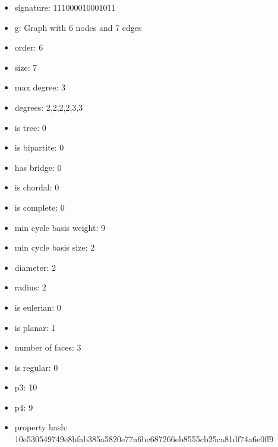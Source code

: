 \begin{itemize}
\item signature: 111000010001011
\item g: Graph with 6 nodes and 7 edges
\item order: 6
\item size: 7
\item max degree: 3
\item degrees: 2,2,2,2,3,3
\item is tree: 0
\item is bipartite: 0
\item has bridge: 0
\item is chordal: 0
\item is complete: 0
\item min cycle basis weight: 9
\item min cycle basis size: 2
\item diameter: 2
\item radius: 2
\item is eulerian: 0
\item is planar: 1
\item number of faces: 3
\item is regular: 0
\item p3: 10
\item p4: 9
\item property hash: 10e530549749e8bfab385a5820e77a6be687266eb8555cb25ca81df74a6e0ff9
\end{itemize}
\newpage
\begin{figure}
\end{figure}
